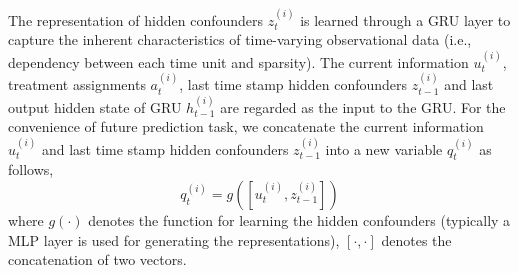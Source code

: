 The representation of hidden confounders $z^{(i)}_t$ is learned through a GRU layer to capture the inherent characteristics of time-varying observational data (i.e., dependency between each time unit and sparsity). The current information $u^{(i)}_t$, treatment assignments $a^{(i)}_t$, last time stamp hidden confounders $z^{(i)}_{t-1}$ and last output hidden state of GRU $h^{(i)}_{t-1}$ are regarded as the input to the GRU. For the convenience of future prediction task, we concatenate the current information $u^{(i)}_t$ and last time stamp hidden confounders $z^{(i)}_{t-1}$ into a new variable $q^{(i)}_t$ as follows,
\begin{equation}
\label{eq:hidden-representation-confounding}
    q^{(i)}_t=g([u^{(i)}_t,z^{(i)}_{t-1}])
\end{equation}
where $g(\cdot)$ denotes the function for learning the hidden confounders (typically a MLP layer is used for generating the representations), $[\cdot,\cdot]$ denotes the concatenation of two vectors.

